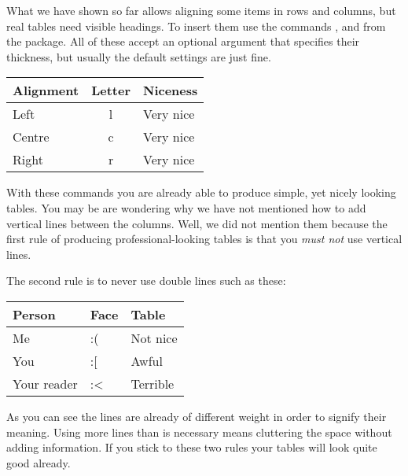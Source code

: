 What we have shown so far allows aligning some items in rows and columns,
but real tables need visible headings. To insert them use the commands
,  and  from the  package.
All of these accept an optional argument that specifies their thickness, but
usually the default settings are just fine.
\begin{example}[examplewidth=0.43\linewidth]
\begin{tabular}{lcl}
  \toprule
  Alignment & Letter & Niceness  \\
  \midrule
  Left      & l      & Very nice \\
  Centre    & c      & Very nice \\
  Right     & r      & Very nice \\
  \bottomrule
\end{tabular}
\end{example}

With these commands you are already able to produce simple, yet nicely looking
tables. You may be are wondering why we have not mentioned how to add vertical
lines between the columns. Well, we did not mention them because the first rule
of producing professional-looking tables is that you \emph{must not} use
vertical lines.

The second rule is to never use double lines such as these:
\begin{chktexignore}
  \begin{example}[examplewidth=0.43\linewidth]
\begin{tabular}{lll}
  \toprule[0.1cm]
  \toprule
  Person      & Face & Table    \\
  \midrule
  \midrule
  Me          & :(   & Not nice \\
  You         & :[   & Awful    \\
  Your reader & :<   & Terrible \\
  \bottomrule
  \bottomrule[0.1cm]
\end{tabular}
\end{example}
\end{chktexignore}
As you can see the lines are already of different weight in order to signify
their meaning. Using more lines than is necessary means cluttering the space
without adding information. If you stick to these two rules your tables will
look quite good already.


